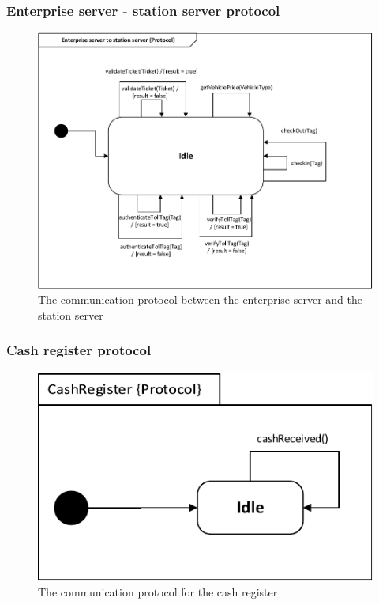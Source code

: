 \subsubsection*{Enterprise server - station server protocol}
\begin{figure}[H]
\centering
\includegraphics[width=0.7\linewidth]{img/behaviour_state_machines/protocol_state_machines/protocol_state_machine_enterprise_server_to_station_server}
\caption{The communication protocol between the enterprise server and the station server}
\label{fig:protocol_state_machine_enterprise_server_to_station_server}
\end{figure}

\subsubsection*{Cash register protocol}
\begin{figure}[H]
\centering
\includegraphics[width=0.7\linewidth]{img/behaviour_state_machines/protocol_state_machines/protocol_state_machine_CR_TLC}
\caption{The communication protocol for the cash register}
\label{fig:protocol_state_machine_CR_TLC}
\end{figure}


